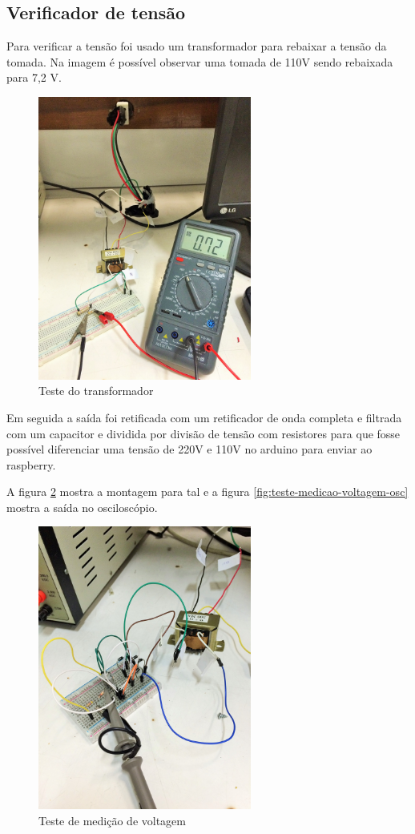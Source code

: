\subsection{Verificador de tensão}

Para verificar a tensão foi usado um transformador para rebaixar a tensão da tomada. Na imagem é possível observar uma tomada de 110V sendo rebaixada para 7,2 V.

\begin{figure}[H]
\centering
\includegraphics[width=7cm,keepaspectratio]{figuras/sensor-tensao.jpg} 
\caption{\label{fig:sensor-tensao} Teste do transformador}
\end{figure}

Em seguida a saída foi retificada com um retificador de onda completa e filtrada com um capacitor e dividida por divisão de tensão com resistores para que fosse possível diferenciar uma tensão de 220V e 110V no arduino para enviar ao raspberry.

A figura \ref{fig:teste-medicao-voltagem} mostra a montagem para tal e a figura \ref{fig:teste-medicao-voltagem-osc} mostra a saída no osciloscópio.

\begin{figure}[H]
\centering
\includegraphics[width=7cm,keepaspectratio]{figuras/teste-medicao-voltagem.jpg} 
\caption{\label{fig:teste-medicao-voltagem} Teste de medição de voltagem} 
\end{figure}

